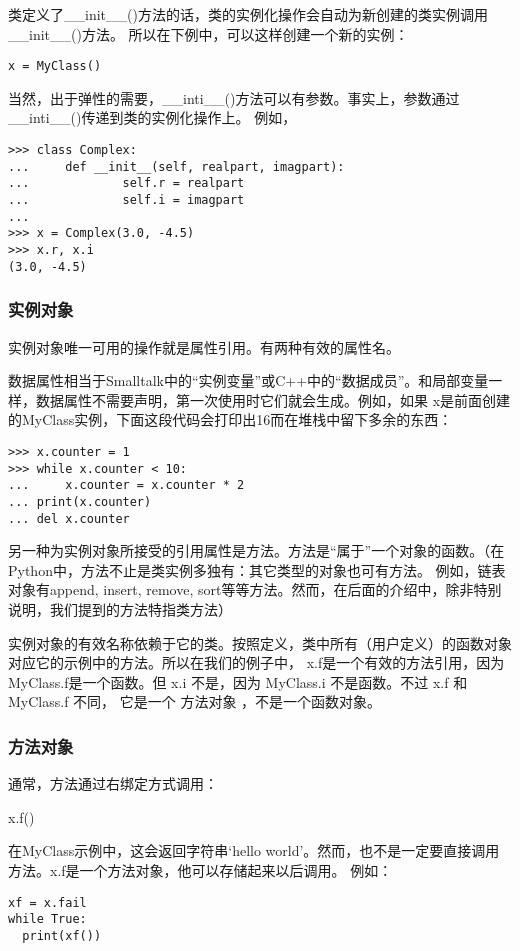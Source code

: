\documentclass[UTF8]{ctexart}
\begin{document}
类定义了\_\_init\_\_()方法的话，类的实例化操作会自动为新创建的类实例调用\_\_init\_\_()方法。
所以在下例中，可以这样创建一个新的实例：
\begin{verbatim}
x = MyClass()
\end{verbatim}

当然，出于弹性的需要，\_\_inti\_\_()方法可以有参数。事实上，参数通过\_\_inti\_\_()传递到类的实例化操作上。
例如，
\begin{verbatim}
>>> class Complex:
...     def __init__(self, realpart, imagpart):
...             self.r = realpart
...             self.i = imagpart
...
>>> x = Complex(3.0, -4.5)
>>> x.r, x.i
(3.0, -4.5)
\end{verbatim}

\subsubsection{实例对象}
实例对象唯一可用的操作就是属性引用。有两种有效的属性名。

数据属性相当于Smalltalk中的``实例变量''或C++中的``数据成员''。和局部变量一样，数据属性不需要声明，第一次使用时它们就会生成。例如，如果
x是前面创建的MyClass实例，下面这段代码会打印出16而在堆栈中留下多余的东西：
\begin{verbatim}
>>> x.counter = 1
>>> while x.counter < 10:
...     x.counter = x.counter * 2
... print(x.counter)
... del x.counter
\end{verbatim}

另一种为实例对象所接受的引用属性是方法。方法是``属于''一个对象的函数。（在Python中，方法不止是类实例多独有：其它类型的对象也可有方法。
例如，链表对象有append, insert, remove, sort等等方法。然而，在后面的介绍中，除非特别说明，我们提到的方法特指类方法）

实例对象的有效名称依赖于它的类。按照定义，类中所有（用户定义）的函数对象对应它的示例中的方法。所以在我们的例子中，
x.f是一个有效的方法引用，因为MyClass.f是一个函数。但 x.i 不是，因为 MyClass.i 不是函数。不过 x.f 和 MyClass.f 不同，
它是一个 方法对象 ，不是一个函数对象。

\subsubsection{方法对象}
通常，方法通过右绑定方式调用：

x.f()

在MyClass示例中，这会返回字符串`hello world'。然而，也不是一定要直接调用方法。x.f是一个方法对象，他可以存储起来以后调用。
例如：
\begin{verbatim}
xf = x.fail
while True:
  print(xf())
\end{verbatim}
\end{document}
